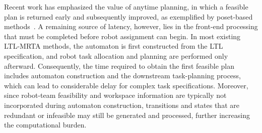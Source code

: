 \documentclass[lettersize,journal]{IEEEtran}
\theoremstyle{italiclemma}
\theoremstyle{italiclemma}
\theoremstyle{definition}
\begin{document}
Recent work has emphasized the value of anytime planning, in which a feasible plan is returned early and subsequently improved, as exemplified by poset-based methods~\cite{liu2024time}. A remaining source of latency, however, lies in the front-end processing that must be completed before robot assignment can begin. In most existing LTL-MRTA methods, the automaton is first constructed from the LTL specification, and robot task allocation and planning are performed only afterward\cite{11618058,11615804}. Consequently, the time required to obtain the first feasible plan includes automaton construction and the downstream task-planning process, which can lead to considerable delay for complex task specifications. Moreover, since robot-team feasibility and workspace information are typically not incorporated during automaton construction, transitions and states that are redundant or infeasible may still be generated and processed, further increasing the computational burden.
\end{document}
